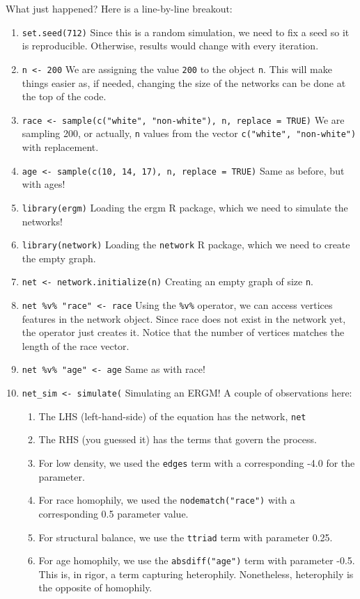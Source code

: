 \documentclass[
]{book}
\begin{document}
What just happened? Here is a line-by-line breakout:

\begin{enumerate}
\def\labelenumi{\arabic{enumi}.}
\item
  \texttt{set.seed(712)} Since this is a random simulation, we need to fix a seed so it is reproducible. Otherwise, results would change with every iteration.
\item
  \texttt{n\ \textless{}-\ 200} We are assigning the value \texttt{200} to the object \texttt{n}. This will make things easier as, if needed, changing the size of the networks can be done at the top of the code.
\item
  \texttt{race\ \textless{}-\ sample(c("white",\ "non-white"),\ n,\ replace\ =\ TRUE)} We are sampling 200, or actually, \texttt{n} values from the vector \texttt{c("white",\ "non-white")} with replacement.
\item
  \texttt{age\ \textless{}-\ sample(c(10,\ 14,\ 17),\ n,\ replace\ =\ TRUE)} Same as before, but with ages!
\item
  \texttt{library(ergm)} Loading the ergm R package, which we need to simulate the networks!
\item
  \texttt{library(network)} Loading the \texttt{network} R package, which we need to create the empty graph.
\item
  \texttt{net\ \textless{}-\ network.initialize(n)} Creating an empty graph of size \texttt{n}.
\item
  \texttt{net\ \%v\%\ "race"\ \textless{}-\ race} Using the \texttt{\%v\%} operator, we can access vertices features in the network object. Since race does not exist in the network yet, the operator just creates it. Notice that the number of vertices matches the length of the race vector.
\item
  \texttt{net\ \%v\%\ "age"\ \textless{}-\ age} Same as with race!
\item
  \texttt{net\_sim\ \textless{}-\ simulate(} Simulating an ERGM! A couple of observations here:

  \begin{enumerate}
  \def\labelenumii{\alph{enumii}.}
  \item
    The LHS (left-hand-side) of the equation has the network, \texttt{net}
  \item
    The RHS (you guessed it) has the terms that govern the process.
  \item
    For low density, we used the \texttt{edges} term with a corresponding
    -4.0 for the parameter.
  \item
    For race homophily, we used the \texttt{nodematch("race")} with a
    corresponding 0.5 parameter value.
  \item
    For structural balance, we use the \texttt{ttriad} term with parameter
    0.25.
  \item
    For age homophily, we use the \texttt{absdiff("age")} term with parameter
    -0.5. This is, in rigor, a term capturing heterophily. Nonetheless,
    heterophily is the opposite of homophily.
  \end{enumerate}
\end{enumerate}
\end{document}
